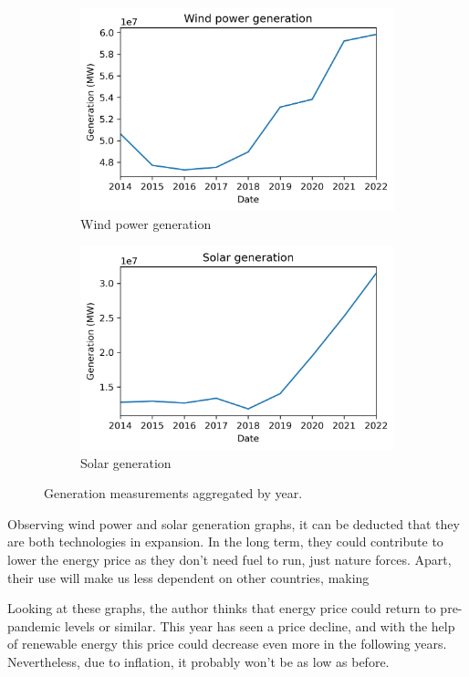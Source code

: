 \begin{figure}[H]\ContinuedFloat
    \begin{subfigure}{.45\textwidth}
        \centering
        \includegraphics[width=1\linewidth]{images/analysis/wind-gen-yearly}
        \caption{Wind power generation}
    \end{subfigure}
    \begin{subfigure}{.45\textwidth}
        \centering
        \includegraphics[width=1\linewidth]{images/analysis/solar-gen-yearly}
        \caption{Solar generation}
    \end{subfigure}

    \caption{Generation measurements aggregated by year.}
    \label{fig:gen-yearly}
\end{figure}

Observing wind power and solar generation graphs, it can be deducted that they are both technologies in expansion. In the long term, they could contribute to lower the energy price as they don't need fuel to run, just nature forces. Apart, their use will make us less dependent on other countries, making

Looking at these graphs, the author thinks that energy price could return to pre-pandemic levels or similar. This year has seen a price decline, and with the help of renewable energy this price could decrease even more in the following years. Nevertheless, due to inflation, it probably won't be as low as before.